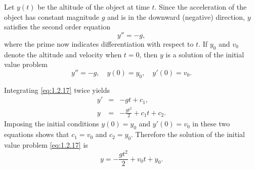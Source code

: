 \begin{examplesolution}
 Let $y(t)$ be the altitude of the object at time $t$. Since the acceleration of the
object has constant magnitude $g$ and is in the downward (negative) direction, $y$ satisfies the
second order equation
\[
  y''=-g,
\]
where the prime now indicates differentiation with respect to $t$. If $y_{0}$ and $v_{0}$ denote the
altitude and velocity when $t=0$, then $y$ is a solution of the initial value problem
\begin{equation}
  \label{eq:1.2.17}y''=-g,\quad y(0)=y_{0},\quad y'(0)=v_{0}.
\end{equation}

 Integrating \eqref{eq:1.2.17} twice yields
\begin{eqnarray*}
  y' & = & -gt+c_{1}, \\
  y  & = & -\frac{gt^{2}}{2}+c_{1}t+c_{2}.
\end{eqnarray*}
Imposing the initial conditions $y(0)=y_{0}$ and $y'(0)=v_{0}$ in these two equations shows that
$c_{1}=v_{0}$ and $c_{2}=y_{0}$. Therefore the solution of the initial value problem
\eqref{eq:1.2.17} is
\[
  y=-\frac{gt^{2}}{2}+v_{0}t+y_{0}.
\]
\end{examplesolution}

